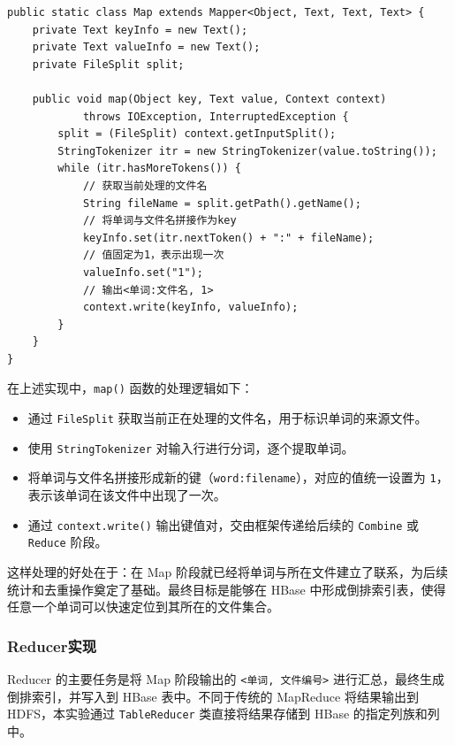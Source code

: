 \documentclass[]{bitreport}
\begin{document}
\begin{lstlisting}[style=java, caption={Mapper核心代码}]
public static class Map extends Mapper<Object, Text, Text, Text> {
    private Text keyInfo = new Text();
    private Text valueInfo = new Text();
    private FileSplit split;

    public void map(Object key, Text value, Context context) 
            throws IOException, InterruptedException {
        split = (FileSplit) context.getInputSplit();
        StringTokenizer itr = new StringTokenizer(value.toString());
        while (itr.hasMoreTokens()) {
            // 获取当前处理的文件名
            String fileName = split.getPath().getName();
            // 将单词与文件名拼接作为key
            keyInfo.set(itr.nextToken() + ":" + fileName);
            // 值固定为1，表示出现一次
            valueInfo.set("1");
            // 输出<单词:文件名, 1>
            context.write(keyInfo, valueInfo);
        }
    }
}
\end{lstlisting}

在上述实现中，\texttt{map()} 函数的处理逻辑如下：
\begin{itemize}
  \item 通过 \texttt{FileSplit} 获取当前正在处理的文件名，用于标识单词的来源文件。
  \item 使用 \texttt{StringTokenizer} 对输入行进行分词，逐个提取单词。
  \item 将单词与文件名拼接形成新的键（\texttt{word:filename}），对应的值统一设置为 \texttt{1}，表示该单词在该文件中出现了一次。
  \item 通过 \texttt{context.write()} 输出键值对，交由框架传递给后续的 \texttt{Combine} 或 \texttt{Reduce} 阶段。
\end{itemize}

这样处理的好处在于：在 Map 阶段就已经将单词与所在文件建立了联系，为后续统计和去重操作奠定了基础。最终目标是能够在 HBase 中形成倒排索引表，使得任意一个单词可以快速定位到其所在的文件集合。

\subsubsection{Reducer实现}

Reducer 的主要任务是将 Map 阶段输出的 \texttt{<单词, 文件编号>} 进行汇总，最终生成倒排索引，并写入到 HBase 表中。不同于传统的 MapReduce 将结果输出到 HDFS，本实验通过 \texttt{TableReducer} 类直接将结果存储到 HBase 的指定列族和列中。
\end{document}
